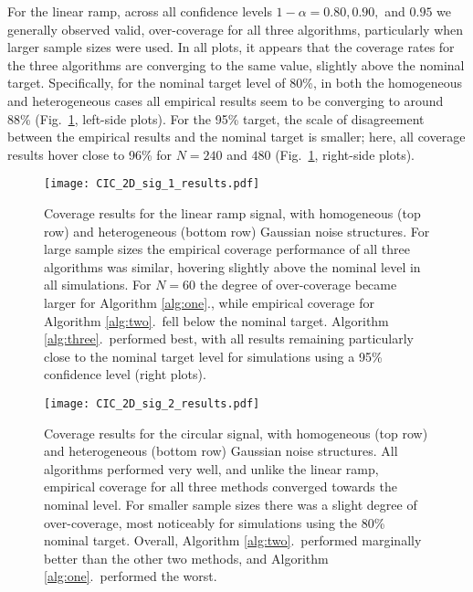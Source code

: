 For the linear ramp, across all confidence levels $1 - \alpha = 0.80, 0.90,$ and $0.95$ we generally observed valid, over-coverage for all three algorithms, particularly when larger sample sizes were used. In all plots, it appears that the coverage rates for the three algorithms are converging to the same value, slightly above the nominal target. Specifically, for the nominal target level of 80\%, in both the homogeneous and heterogeneous cases all empirical results seem to be converging to around 88\% (Fig.\ \ref{fig:Cohen_2D_sig_1_results}, left-side plots). For the 95\% target, the scale of disagreement between the empirical results and the nominal target is smaller; here, all coverage results hover close to 96\% for $N = 240$ and $480$ (Fig.\ \ref{fig:Cohen_2D_sig_1_results}, right-side plots).

\begin{figure}[!htbp]
\hspace*{-3.0cm}
\centering
    \texttt{[image: CIC\_2D\_sig\_1\_results.pdf]}
\caption{Coverage results for the linear ramp signal, with homogeneous (top row) and heterogeneous (bottom row) Gaussian noise structures. For large sample sizes the empirical coverage performance of all three algorithms was similar, hovering slightly above the nominal level in all simulations. For $N = 60$ the degree of over-coverage became larger for Algorithm \ref{alg:one}., while empirical coverage for Algorithm \ref{alg:two}.\ fell below the nominal target. Algorithm \ref{alg:three}.\ performed best, with all results remaining particularly close to the nominal target level for simulations using a 95\% confidence level (right plots).}
\label{fig:Cohen_2D_sig_1_results}
\end{figure}

\clearpage

\begin{figure}[!htbp]
\hspace*{-3.0cm}
\centering
    \texttt{[image: CIC\_2D\_sig\_2\_results.pdf]}
\caption{Coverage results for the circular signal, with homogeneous (top row) and heterogeneous (bottom row) Gaussian noise structures. All algorithms performed very well, and unlike the linear ramp, empirical coverage for all three methods converged towards the nominal level. For smaller sample sizes there was a slight degree of over-coverage, most noticeably for simulations using the 80\% nominal target. Overall, Algorithm \ref{alg:two}.\ performed marginally better than the other two methods, and Algorithm \ref{alg:one}.\ performed the worst.}
\label{fig:Cohen_2D_sig_2_results}
\end{figure}

